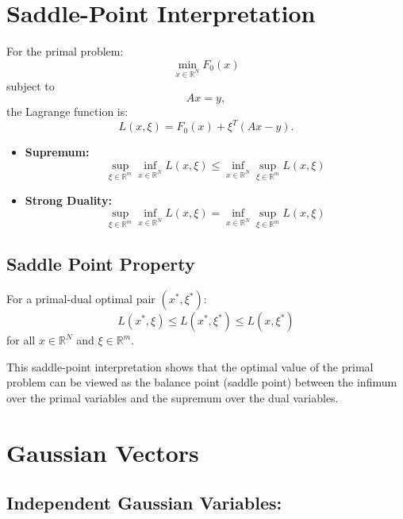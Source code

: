 \documentclass{article}
\begin{document}
\section*{Saddle-Point Interpretation}

For the primal problem:
\[
\min_{x \in \mathbb{R}^N} F_0(x) 
\]
subject to 
\[
Ax = y,
\]
the Lagrange function is:
\[
L(x, \xi) = F_0(x) + \xi^T (Ax - y).
\]

\begin{itemize}
    \item \textbf{Supremum:}
    \[
    \sup_{\xi \in \mathbb{R}^m} \inf_{x \in \mathbb{R}^N} L(x, \xi) \leq \inf_{x \in \mathbb{R}^N} \sup_{\xi \in \mathbb{R}^m} L(x, \xi)
    \]
    
    \item \textbf{Strong Duality:}
    \[
    \sup_{\xi \in \mathbb{R}^m} \inf_{x \in \mathbb{R}^N} L(x, \xi) = \inf_{x \in \mathbb{R}^N} \sup_{\xi \in \mathbb{R}^m} L(x, \xi)
    \]
\end{itemize}

\subsection*{Saddle Point Property}

For a primal-dual optimal pair \((x^*, \xi^*)\):
\[
L(x^*, \xi) \leq L(x^*, \xi^*) \leq L(x, \xi^*)
\]
for all \(x \in \mathbb{R}^N\) and \(\xi \in \mathbb{R}^m\).

This saddle-point interpretation shows that the optimal value of the primal problem can be viewed as the balance point (saddle point) between the infimum over the primal variables and the supremum over the dual variables.


\section*{Gaussian Vectors}

\subsection*{Independent Gaussian Variables:}
\end{document}
